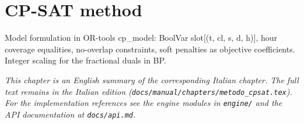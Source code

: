 \chapter{CP-SAT method}
\label{ch:metodo_cpsat_en}

Model formulation in OR-tools cp_model: BoolVar slot[(t, cl, s, d, h)], hour coverage equalities, no-overlap constraints, soft penalties as objective coefficients. Integer scaling for the fractional duals in BP.

\medskip
\noindent
\textit{This chapter is an English summary of the corresponding Italian chapter. The full text remains in the Italian edition (\texttt{docs/manual/chapters/metodo\_cpsat.tex}). For the implementation references see the engine modules in \texttt{engine/} and the API documentation at \texttt{docs/api.md}.}
